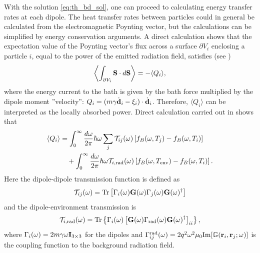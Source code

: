 With the solution \eqref{eq:th_bd_sol}, one can proceed to calculating energy transfer rates at each dipole. The heat transfer rates between particles could in general be calculated from the electromagnetic Poynting vector, but the calculations can be simplified by energy conservation arguments. A direct calculation shows that the expectation value of the Poynting vector's flux across a surface $\partial V_i$ enclosing a particle $i$, equal to the power of the emitted radiation field, satisfies (see )
\begin{equation}
 \left\langle \int_{\partial V_i} \mathbf{S} \cdot d\mathbf{S} \right\rangle = - \langle Q_i \rangle,
\end{equation}
where the energy current to the bath is given by the bath force multiplied by the dipole moment ''velocity'': $Q_i = (m\gamma \dot{\mathbf{d}}_i-\xi_i)\cdot \dot{\mathbf{d}}_i$. Therefore, $\langle Q_i\rangle$ can be interpreted as the locally absorbed power. Direct calculation carried out in  shows that 
\begin{alignat}{2}
 \langle Q_i \rangle &= \int_0^{\infty}\frac{d\omega}{2\pi} \hbar\omega \sum_{j} \mathcal{T}_{ij}(\omega) \left[f_B(\omega,T_j)-f_B(\omega,T_i ) \right] \notag \\
  & \quad + \int_0^{\infty} \frac{d\omega}{2\pi} \hbar \omega \mathcal{T}_{i,\textrm{rad}}(\omega)\left[ f_B(\omega,T_{\textrm{env}})-f_B(\omega,T_i)\right].
\end{alignat}
Here the dipole-dipole transmission function is defined as
\begin{equation}
 \mathcal{T}_{ij}(\omega) = \textrm{Tr} \left[\Gamma_i(\omega) \mathbf{G}(\omega) \Gamma_j(\omega) \mathbf{G}(\omega)^{\dagger} \right]
\end{equation}
and the dipole-environment transmission is 
\begin{equation}
 \mathcal{T}_{i,\textrm{rad}}(\omega) =  \textrm{Tr} \left\{ \Gamma_i(\omega) \left[ \mathbf{G}(\omega) \Gamma_{\textrm{rad}}(\omega) \mathbf{G}(\omega)^{\dagger} \right]_{ii} \right\}, \label{eq:th_Tirad}
\end{equation}
where $\Gamma_i(\omega)=2m\gamma \omega \mathbf{I}_{3 \times 3}$ for the dipoles and $\Gamma^{\textrm{rad}}_{ij}(\omega)= 2 q^2\omega^2\mu_0 \textrm{Im}[\mathbb{G}(\mathbf{r}_i,\mathbf{r}_j;\omega)]$ is the coupling function to the background radiation field.

